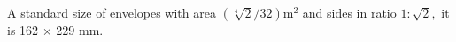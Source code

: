 A standard size of envelopes with area $ ( \sqrt[4]{2} /32 ) \mathrm{m} ^2 $ 
and sides in ratio $ 1 : \sqrt{2} , $ it is 162 \ensuremath{ \times } 229   mm.